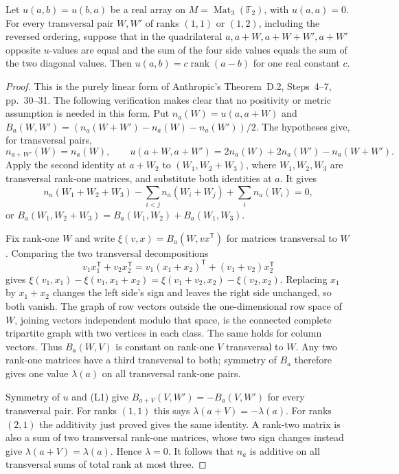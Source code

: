 \begin{lemma}
\label{lem:linear-rank-rigidity}
Let $u(a,b)=u(b,a)$ be a real array on
$M=\operatorname{Mat}_3(\mathbb F_2)$, with $u(a,a)=0$.
For every transversal pair $W,W'$ of ranks $(1,1)$ or $(1,2)$,
including the reversed ordering, suppose that in the quadrilateral
$a,a+W,a+W+W',a+W'$ opposite $u$-values are equal and the
sum of the four side values equals the sum of the two diagonal
values.  Then $u(a,b)=c\operatorname{rank}(a-b)$ for one
real constant $c$.
\end{lemma}
\begin{proof}
This is the purely linear form of Anthropic's Theorem~D.2,
Steps~4--7, pp.~30--31.  The following verification makes clear
that no positivity or metric assumption is needed in this form.
Put $n_a(W)=u(a,a+W)$ and
$B_a(W,W')=(n_a(W+W')-n_a(W)-n_a(W'))/2$.
The hypotheses give, for transversal pairs,
\[
 n_{a+W'}(W)=n_a(W),\qquad
 u(a+W,a+W')=2n_a(W)+2n_a(W')-n_a(W+W').
 \tag{L1}
\]
Apply the second identity at $a+W_2$ to
$(W_1,W_2+W_3)$, where $W_1,W_2,W_3$ are transversal
rank-one matrices, and substitute both identities at $a$.
It gives
\[
 n_a(W_1+W_2+W_3)-\sum_{i<j}n_a(W_i+W_j)
                  +\sum_i n_a(W_i)=0,
\]
or
$B_a(W_1,W_2+W_3)=B_a(W_1,W_2)+B_a(W_1,W_3)$.

Fix rank-one $W$ and write
$\xi(v,x)=B_a(W,vx^{\mathsf T})$ for matrices transversal
to $W$.  Comparing the two transversal decompositions
\[
 v_1x_1^{\mathsf T}+v_2x_2^{\mathsf T}
 =v_1(x_1+x_2)^{\mathsf T}+(v_1+v_2)x_2^{\mathsf T}
\]
gives
$\xi(v_1,x_1)-\xi(v_1,x_1+x_2)
 =\xi(v_1+v_2,x_2)-\xi(v_2,x_2)$.
Replacing $x_1$ by $x_1+x_2$ changes the left side's sign
and leaves the right side unchanged, so both vanish.  The graph
of row vectors outside the one-dimensional row space of $W$,
joining vectors independent modulo that space, is the connected
complete tripartite graph with two vertices in each class.
The same holds for column vectors.  Thus $B_a(W,V)$ is
constant on rank-one $V$ transversal to $W$.  Any two rank-one
matrices have a third transversal to both; symmetry of $B_a$
therefore gives one value $\lambda(a)$ on all transversal
rank-one pairs.

Symmetry of $u$ and (L1) give
$B_{a+V}(V,W')=-B_a(V,W')$ for every transversal pair.
For ranks $(1,1)$ this says
$\lambda(a+V)=-\lambda(a)$.
For ranks $(2,1)$ the additivity just proved gives the same
identity.  A rank-two matrix is also a sum of two transversal
rank-one matrices, whose two sign changes instead give
$\lambda(a+V)=\lambda(a)$.  Hence $\lambda=0$.
It follows that $n_a$ is additive on all transversal sums of
total rank at most three.


\end{proof}
